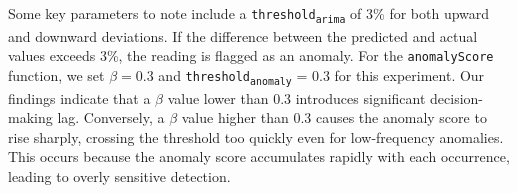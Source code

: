 \documentclass[pdflatex,sn-nature]{sn-jnl}%
\theoremstyle{thmstyleone}%
\theoremstyle{thmstyletwo}%
\theoremstyle{thmstylethree}%
\begin{document}
Some key parameters to note include a \texttt{threshold\textsubscript{arima}} of 3\% for both upward and downward deviations. If the difference between the predicted and actual values exceeds 3\%, the reading is flagged as an anomaly. For the \texttt{anomalyScore} function, we set $\beta=0.3$ and \texttt{threshold\textsubscript{anomaly}} = 0.3 for this experiment. Our findings indicate that a $\beta$ value lower than 0.3 introduces significant decision-making lag. Conversely, a $\beta$ value higher than 0.3 causes the anomaly score to rise sharply, crossing the threshold too quickly even for low-frequency anomalies. This occurs because the anomaly score accumulates rapidly with each occurrence, leading to overly sensitive detection.

\begin{table}[tbp]


\end{table}
\end{document}
